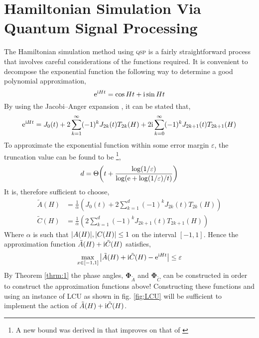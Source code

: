 \documentclass{article}
\begin{document}
\clearpage
\section{Hamiltonian Simulation Via Quantum Signal Processing}
The Hamiltonian simulation method using \textsc{qsp} is a fairly straightforward process that involves careful considerations of the functions required. It is convenient to decompose the exponential function the following way to determine a good polynomial approximation,
\begin{equation}
    \mathrm{e}^{\mathrm{i} H t} = \cos Ht + \mathrm{i} \sin Ht
\end{equation}
By using the Jacobi--Anger expansion \cite{LC17}, it can be stated that,
\begin{equation}
    \mathrm{e}^{\mathrm{i} H t} = J_0(t)+ 2\sum_{k=1}^\infty (-1)^k J_{2k}(t)T_{2k}(H) + 2\mathrm{i}\sum_{k=0}^\infty (-1)^k J_{2k+1}(t)T_{2k+1}(H)
\end{equation}
To approximate the exponential function within some error margin $\varepsilon$, the truncation value can be found to be \cite{GSLW19}\footnote{A new bound was derived in \cite{GSLW19} that improves on that of \cite{LC17}},
\begin{equation}
    d = \Theta\bigg(t + \frac{\log(1/\varepsilon)}{\log(\mathrm{e} + \log(1/\varepsilon)/t)} \bigg)
\end{equation}
It is, therefore sufficient to choose,
\begin{align}
    \tilde{A}(H) &= \frac{1}{\alpha}\left(J_0(t)+ 2\sum_{k=1}^d (-1)^k J_{2k}(t)T_{2k}(H) \right)\\
    \tilde{C}(H) &= \frac{1}{\alpha}\left(2\sum_{k=1}^d (-1)^k J_{2k+1}(t)T_{2k+1}(H) \right)
\end{align}
Where $\alpha$ is such that $\abs{A(H)}, \abs{C(H)} \leq 1$ on the interval $[-1,1]$. Hence the approximation function $\tilde{A}(H) + \mathrm{i}\tilde{C}(H)$ satisfies,
\begin{equation}
    \max_{x\in[-1,1]}\abs{\tilde{A}(H) + \mathrm{i}\tilde{C}(H) - \mathrm{e}^{\mathrm{i} H t}}\leq \varepsilon
\end{equation}
By Theorem \ref{thrm:1} the phase angles, $\boldsymbol{\Phi}_{\tilde{A}}$ and $\boldsymbol{\Phi}_{\tilde{C}}$ can be constructed in order to construct the approximation functions above! Constructing these functions and using an instance of \textsc{LCU} as shown in fig. \ref{fig:LCU} will be sufficient to implement the action of $\tilde{A}(H) + \mathrm{i}\tilde{C}(H)$.

\clearpage
\end{document}
